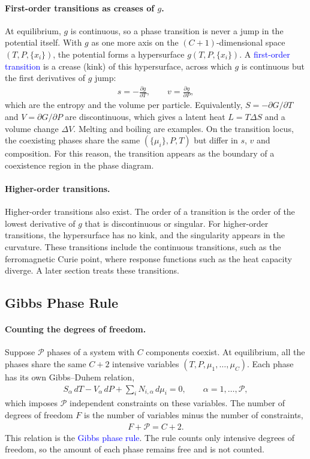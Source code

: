 \paragraph{First-order transitions as creases of $g$.}
At equilibrium, $g$ is continuous, so a phase transition is never a jump in
the potential itself. With $g$ as one more axis on the $(C+1)$-dimensional
space $(T,P,\{x_i\})$, the potential forms a hypersurface
$g(T,P,\{x_i\})$. A \textcolor{blue}{first-order transition} is a crease
(kink) of this hypersurface, across which $g$ is continuous but the first
derivatives of $g$ jump:
\begin{align*}
    s = -\frac{\partial g}{\partial T}, \qquad v = \frac{\partial g}{\partial P},
\end{align*}
which are the entropy and the volume per particle. Equivalently,
$S=-\partial G/\partial T$ and $V=\partial G/\partial P$ are discontinuous,
which gives a latent heat $L = T\Delta S$ and a volume change $\Delta V$.
Melting and boiling are examples. On the transition locus, the coexisting
phases share the same $(\{\mu_i\},P,T)$ but differ in $s$, $v$ and
composition. For this reason, the transition appears as the boundary of a
coexistence region in the phase diagram.

\paragraph{Higher-order transitions.}
Higher-order transitions also exist. The order of a transition is the order
of the lowest derivative of $g$ that is discontinuous or singular. For
higher-order transitions, the hypersurface has no kink, and the singularity
appears in the curvature. These transitions include the continuous
transitions, such as the ferromagnetic Curie point, where response functions
such as the heat capacity diverge. A later section treats these
transitions.

\subsection{Gibbs Phase Rule}

\paragraph{Counting the degrees of freedom.}
Suppose $\mathcal{P}$ phases of a system with $C$ components coexist. At
equilibrium, all the phases share the same $C+2$ intensive variables
$(T,P,\mu_1,\dots,\mu_C)$. Each phase has its own Gibbs--Duhem relation,
\begin{align*}
    S_\alpha\,dT - V_\alpha\,dP + \sum_i N_{i,\alpha}\,d\mu_i = 0,
    \qquad \alpha = 1,\dots,\mathcal{P},
\end{align*}
which imposes $\mathcal{P}$ independent constraints on these variables. The
number of degrees of freedom $F$ is the number of variables minus the number
of constraints,
\begin{align}
    \boxed{F+\mathcal{P}=C+2.}
\end{align}
This relation is the \textcolor{blue}{Gibbs phase rule}. The rule counts
only intensive degrees of freedom, so the amount of each phase remains free
and is not counted.

